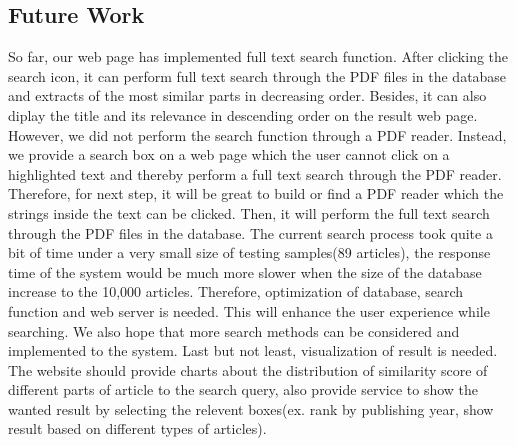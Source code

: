 
\subsection{Future Work}
So far, our web page has  implemented full text search function. After clicking the search icon, it can perform full text search through the PDF files in the database and extracts of the most similar parts in decreasing order. Besides, it can also diplay the title and its relevance in descending order  on the result web page.
However, we did not perform the search function through a PDF reader. Instead, we provide a search box on a web page which the user cannot click on a highlighted text and thereby perform a full text search through the PDF reader. Therefore, for next step, it will be great to build or find a PDF reader which the strings inside the text can be clicked. Then, it will perform the full text search through the PDF files in the database. The current search process took quite a bit of time under a very small size of testing samples(89 articles), the response time of the system would be much more slower when the size of the database increase to the 10,000 articles. Therefore, optimization of database, search function and web server is needed. This will enhance the user experience while searching. We also hope that more search methods can be considered and implemented to the system. Last but not least, visualization of result is needed. The website should provide charts about the distribution of similarity score of different parts of article to the search query, also provide service to show the wanted result by selecting the relevent boxes(ex. rank by publishing year, show result based on different types of articles).